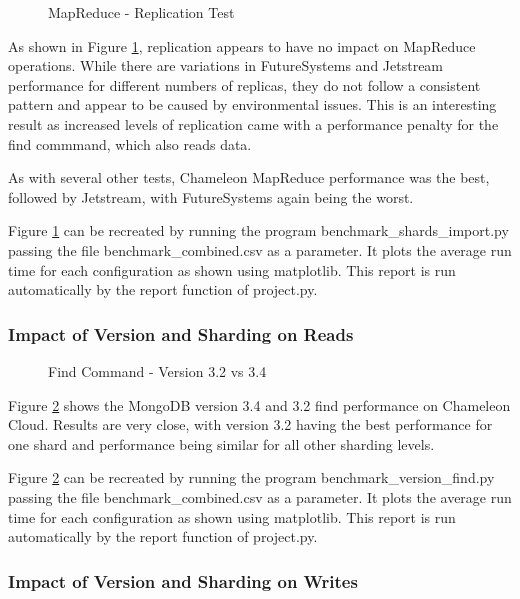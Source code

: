 \documentclass[9pt,twocolumn,twoside]{../../styles/osajnl}
\begin{document}
\begin{figure}[htbp]
\centering
{}
\caption{MapReduce - Replication Test}
\label{fig:replica-mapreduce}
\end{figure}

As shown in Figure \ref{fig:replica-mapreduce}, replication appears to
have no impact on MapReduce operations. While there are variations in
FutureSystems and Jetstream performance for different numbers of
replicas, they do not follow a consistent pattern and appear to be
caused by environmental issues. This is an interesting result as
increased levels of replication came with a performance penalty for
the find commmand, which also reads data.

As with several other tests, Chameleon MapReduce performance was the
best, followed by Jetstream, with FutureSystems again being the worst.

Figure \ref{fig:replica-mapreduce} can be recreated by running the
program benchmark\_shards\_import.py passing the file
benchmark\_combined.csv as a parameter. It plots the average run time
for each configuration as shown using matplotlib. This report is run
automatically by the report function of project.py.





\subsubsection{Impact of Version and Sharding on Reads}


\begin{figure}[htbp]
\centering
{}
\caption{Find Command - Version 3.2 vs 3.4}
\label{fig:version-find}
\end{figure}

Figure \ref{fig:version-find} shows the MongoDB version 3.4 and 3.2
find performance on Chameleon Cloud. Results are very close, with
version 3.2 having the best performance for one shard and performance
being similar for all other sharding levels.

Figure \ref{fig:version-find} can be recreated by running the program
benchmark\_version\_find.py passing the file benchmark\_combined.csv
as a parameter. It plots the average run time for each configuration
as shown using matplotlib. This report is run automatically by the
report function of project.py.

\subsubsection{Impact of Version and Sharding on Writes}
\end{document}
